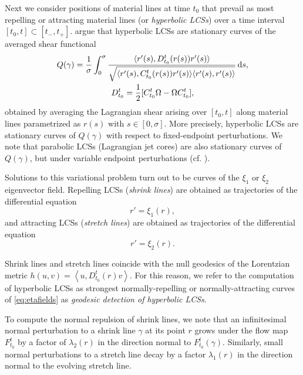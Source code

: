 \documentclass{article}
\begin{document}
Next we consider positions of material lines at time $t_0$ that prevail as most repelling or attracting material lines (or \emph{hyperbolic LCSs}) over a time interval $[t_0,t] \subset [t_-,t_+]$.
\textcite{farazmand14:_shearless} argue that hyperbolic LCSs are stationary curves of the averaged shear functional
\begin{gather*}
Q(\gamma) = \frac{1}{\sigma} \int_0^\sigma \frac{\langle r'(s),D_{t_0}^t(r(s)) r'(s)\rangle}{\sqrt{\langle r'(s),C_{t_0}^t(r(s)) r'(s)\rangle\langle r'(s),r'(s)\rangle}}\dif s,\\
D_{t_0}^t = \frac12 [C_{t_0}^t \Omega - \Omega C_{t_0}^t],
\end{gather*}
obtained by averaging the Lagrangian shear arising over $[t_0,t]$ along material lines parametrized as $r(s)$ with $s \in [0,\sigma]$.
More precisely, hyperbolic LCSs are stationary curves of $Q(\gamma)$ with respect to fixed-endpoint perturbations.
We note that parabolic LCSs (Lagrangian jet cores) are also stationary curves of $Q(\gamma)$, but under variable endpoint perturbations (cf. \textcite{farazmand14:_shearless}).

Solutions to this variational problem turn out to be curves of the $\xi_1$ or $\xi_2$ eigenvector field.
Repelling LCSs (\emph{shrink lines}) are obtained as trajectories of the differential equation
\begin{equation}
r' = \xi_1(r),
\label{eq:shrink line}
\end{equation}
and attracting LCSs (\emph{stretch lines}) are obtained as trajectories of the differential equation
\begin{equation}
r' = \xi_2(r).
\label{eq:stretch line}
\end{equation}

\begin{sloppypar}
Shrink lines and stretch lines coincide with the null geodesics of the Lorentzian metric $h(u,v) = \left\langle u,D_{t_0}^t(r) v \right\rangle$.
For this reason, we refer to the computation of hyperbolic LCSs as strongest normally-repelling or normally-attracting curves of \cref{eq:etafields} as \emph{geodesic detection of hyperbolic LCSs}.
\end{sloppypar}

To compute the normal repulsion of shrink lines, we note that an infinitesimal
normal perturbation to a shrink line $\gamma$ at its point $r$ grows under the flow map $F_{t_0}^t$ by a factor of $\lambda_2(r)$ in the direction normal to $F_{t_0}^t(\gamma)$.
Similarly, small normal perturbations to a stretch line decay by a factor $\lambda_1(r)$ in the direction normal to the evolving stretch line.
\end{document}
